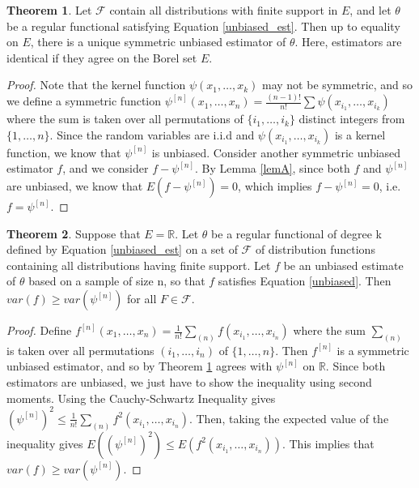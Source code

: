 \documentclass{article}
\newcommand{\R}{{\mathbb{R}}}
\theoremstyle{definition}
\newtheorem{theorem}{Theorem}
\numberwithin{Def}{section}
\begin{document}
\begin{theorem}\label{unique}
Let $\mathcal{F}$ contain all distributions with finite support in $E$, and let $\theta$ be a regular functional satisfying Equation \ref{unbiased_est}. Then up to equality on $E$, there is a unique symmetric unbiased estimator of $\theta$. Here, estimators are identical if they agree on the Borel set $E$.
\end{theorem}
\begin{proof}
Note that the kernel function $\psi(x_1, \dotsc, x_k)$ may not be symmetric, and so we define a symmetric function $\psi^{[n]}(x_1, \dotsc, x_n) = \frac{(n-1)!}{n!}\sum \psi(x_{i_1}, \dotsc, x_{i_k})$ where the sum is taken over all permutations of $\{i_1, \dotsc, i_k\}$ distinct integers from $\{1, \dotsc, n\}$. Since the random variables are i.i.d and $\psi(x_{i_1}, \dotsc, x_{i_k})$ is a kernel function, we know that $\psi^{[n]}$ is unbiased. Consider another symmetric unbiased estimator $f$, and we consider $f - \psi^{[n]}$. By Lemma \ref{lemA}, since both $f$ and $\psi^{[n]}$ are unbiased, we know that $E(f - \psi^{[n]}) = 0$, which implies $f - \psi^{[n]} = 0$, i.e. $f = \psi^{[n]}$. 
\end{proof}

 \begin{theorem}
    Suppose that $E = \R$. Let $\theta$ be a regular functional of degree k defined by Equation \ref{unbiased_est} on a set of $\mathcal{F}$ of distribution functions containing all distributions having finite support. Let $f$ be an unbiased estimate of $\theta$ based on a sample of size n, so that $f$ satisfies Equation \ref{unbiased}. Then $var(f) \geq var(\psi^{[n]})$ for all $F \in \mathcal{F}$. 
    \end{theorem}
    
   \begin{proof}
    Define $f^{[n]}(x_1, \dotsc, x_n) = \frac{1}{n!}\sum_{(n)}f(x_{i_1}, \dotsc, x_{i_n})$ where the sum $\sum_{(n)}$ is taken over all permutations $(i_1, \dotsc, i_n)$ of $\{1, \dotsc, n\}$. Then $f^{[n]}$ is a symmetric unbiased estimator, and so by Theorem \ref{unique} agrees with $\psi^{[n]}$ on $\R$. Since both estimators are unbiased, we just have to show the inequality using second moments. Using the Cauchy-Schwartz Inequality gives $(\psi^{[n]})^2 \leq \frac{1}{n!}\sum_{(n)}f^2(x_{i_1}, \dotsc, x_{i_n})$. Then, taking the expected value of the inequality gives $E((\psi^{[n]})^2) \leq E(f^2(x_{i_1}, \dotsc, x_{i_n}))$. This implies that $var(f) \geq var(\psi^{[n]})$.
    \end{proof}
 
\end{document}
